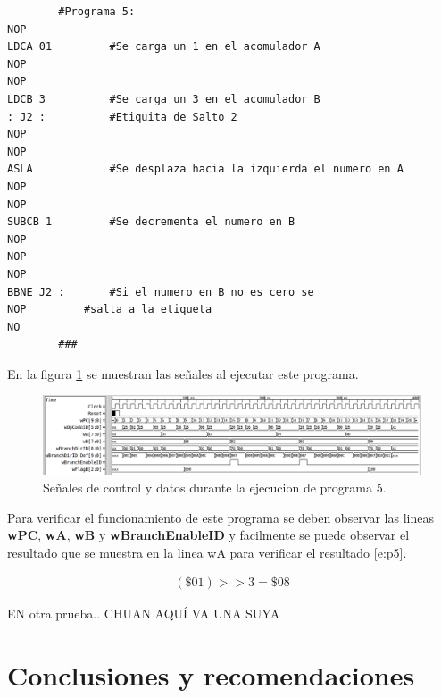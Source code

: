 \documentclass[paper=letter, fontsize=12pt]{article}
\begin{document}
\begin{lstlisting}
		#Programa 5:
NOP
LDCA 01			#Se carga un 1 en el acomulador A
NOP
NOP
LDCB 3			#Se carga un 3 en el acomulador B
: J2 :			#Etiquita de Salto 2
NOP
NOP
ASLA			#Se desplaza hacia la izquierda el numero en A
NOP
NOP
SUBCB 1			#Se decrementa el numero en B
NOP
NOP
NOP
BBNE J2 :		#Si el numero en B no es cero se 
NOP			#salta a la etiqueta
NO
		###
\end{lstlisting}

En la figura \ref{i:p5} se muestran las señales al ejecutar este programa.\\

\begin{figure}[hbtp]
\centering
\includegraphics[width=1\linewidth]{../media/Prog5.png}
\caption{Señales de control y datos durante la ejecucion de programa 5.}
\label{i:p5}
\end{figure}


Para verificar el funcionamiento de este programa se deben observar las lineas \textbf{wPC}, \textbf{wA}, \textbf{wB} y \textbf{wBranchEnableID} y facilmente se puede observar el resultado que se muestra en la linea wA para verificar el resultado \ref{e:p5}.

\begin{align} 
\label{e:p5}
(\$01) >> 3 = \$08
\end{align}

EN otra prueba.. CHUAN AQUÍ VA UNA SUYA

\clearpage
\section{Conclusiones y recomendaciones}
\end{document}
